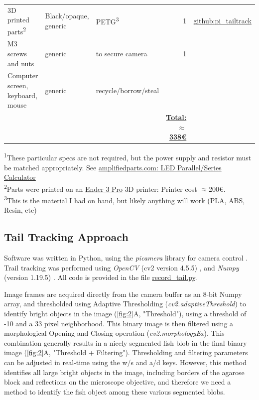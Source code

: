 \documentclass[9pt,lineno]{RandlettLab_elife}
\begin{document}
\begin{table}[bt]
\begin{tabular}{l l l r l}
\\
3D printed parts\textsuperscript{2}
    & Black/opaque, generic 
        & PETG\textsuperscript{3}
            & 1
                & \href{https://github.com/owenrandlett/pi_tailtrack/tree/main/3d_printing}{github:pi\_tailtrack}

\\
M3 screws and nuts
    & generic
        & to secure camera
            & 1
                & 

\\
Computer screen, keyboard, mouse
    & generic 
        & recycle/borrow/steal
            & 
                & 
\\
\midrule
    &  
        & 
            & \textbf{\underline{Total: $\approx$338€}}
                & 
\\

\bottomrule
\end{tabular}

\medskip 
\textsuperscript{1}These particular specs are not required, but the power supply and resistor must be matched appropriately. See \href{https://www.amplifiedparts.com/tech-articles/led-parallel-series-calculator}{amplifiedparts.com: LED Parallel/Series Calculator}
\\
\textsuperscript{2}Parts were printed on an \href{https://www.creality.com/products/ender-3-pro-3d-printer}{Ender 3 Pro} 3D printer: Printer cost $\approx$200€.
\\
\textsuperscript{3}This is the material I had on hand, but likely anything will work (PLA, ABS, Resin, etc)

\end{table}

\subsection{Tail Tracking Approach}

Software was written in Python, using the \emph{picamera} library for camera control \citep{picamera}. Trail tracking was performed using \emph{OpenCV} (cv2 version 4.5.5) \citep{opencv_library}, and \emph{Numpy} (version 1.19.5) \citep{harris2020array}. All code is provided in the file \href{https://github.com/owenrandlett/pi_tailtrack/blob/main/record_tail.py}{record\_tail.py}. 

Image frames are acquired directly from the camera buffer as an 8-bit Numpy array, and thresholded using Adaptive Thresholding (\emph{cv2.adaptiveThreshold}) to identify bright objects in the image (\autoref{fig:2}A, "Threshold"), using a threshold of -10 and a 33 pixel neighborhood. This binary image is then filtered using a morphological Opening and Closing operation (\emph{cv2.morphologyEx}). This combination generally results in a nicely segmented fish blob in the final binary image (\autoref{fig:2}A, "Threshold + Filtering"). Thresholding and filtering parameters can be adjusted in real-time using the w/s and a/d keys. However, this method identifies all large bright objects in the image, including borders of the agarose block and reflections on the microscope objective, and therefore we need a method to identify the fish object among these various segmented blobs. 
\end{document}
